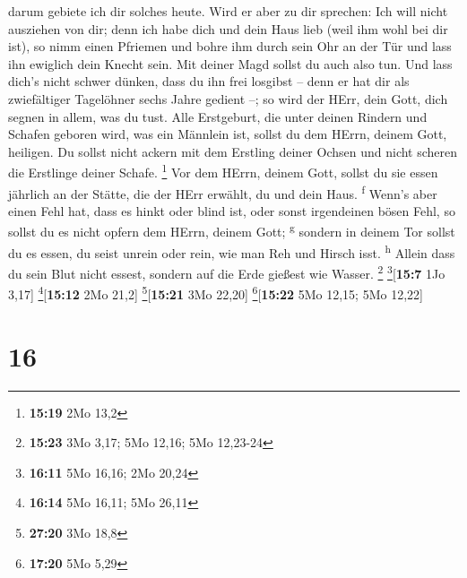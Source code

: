 darum gebiete ich dir solches heute.  Wird er aber zu dir
sprechen: Ich will nicht ausziehen von dir; denn ich habe dich und dein
Haus lieb (weil ihm wohl bei dir ist),  so nimm einen
Pfriemen und bohre ihm durch sein Ohr an der Tür und lass ihn ewiglich
dein Knecht sein. Mit deiner Magd sollst du auch also tun.
 Und lass dich's nicht schwer dünken, dass du ihn frei
losgibst -- denn er hat dir als zwiefältiger Tagelöhner sechs Jahre
gedient --; so wird der HErr, dein Gott, dich segnen in allem, was du
tust.  Alle Erstgeburt, die unter deinen Rindern und
Schafen geboren wird, was ein Männlein ist, sollst du dem HErrn, deinem
Gott, heiligen. Du sollst nicht ackern mit dem Erstling deiner Ochsen
und nicht scheren die Erstlinge deiner Schafe. \footnote{\textbf{15:19}
  2Mo 13,2}  Vor dem HErrn, deinem Gott, sollst du sie
essen jährlich an der Stätte, die der HErr erwählt, du und dein Haus.
\textsuperscript{f}  Wenn's aber einen Fehl hat, dass es
hinkt oder blind ist, oder sonst irgendeinen bösen Fehl, so sollst du es
nicht opfern dem HErrn, deinem Gott; \textsuperscript{g} 
sondern in deinem Tor sollst du es essen, du seist unrein oder rein, wie
man Reh und Hirsch isst. \textsuperscript{h}  Allein dass
du sein Blut nicht essest, sondern auf die Erde gießest wie Wasser.
\footnote{\textbf{15:23} 3Mo 3,17; 5Mo 12,16; 5Mo 12,23-24}
\footnote{\textbf{16:11} 5Mo 16,16; 2Mo 20,24}{[}\textbf{15:7} 1Jo
3,17{]} \footnote{\textbf{16:14} 5Mo 16,11; 5Mo 26,11}{[}\textbf{15:12}
2Mo 21,2{]} \footnote{\textbf{27:20} 3Mo 18,8}{[}\textbf{15:21} 3Mo
22,20{]} \footnote{\textbf{17:20} 5Mo 5,29}{[}\textbf{15:22} 5Mo 12,15;
5Mo 12,22{]}

\hypertarget{section-15}{%
\section{16}\label{section-15}}

